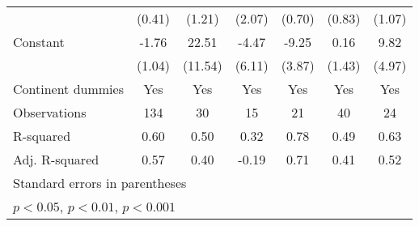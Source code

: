 {\begin{tabular}{l*{6}{c}}
                    &      (0.41)         &      (1.21)         &      (2.07)         &      (0.70)         &      (0.83)         &      (1.07)         \\
\addlinespace
Constant            &       -1.76         &       22.51         &       -4.47         &       -9.25\sym{*}  &        0.16         &        9.82         \\
                    &      (1.04)         &     (11.54)         &      (6.11)         &      (3.87)         &      (1.43)         &      (4.97)         \\
\addlinespace
Continent dummies   &         Yes         &         Yes         &         Yes         &         Yes         &         Yes         &         Yes         \\
\midrule
Observations        &         134         &          30         &          15         &          21         &          40         &          24         \\
R-squared           &        0.60         &        0.50         &        0.32         &        0.78         &        0.49         &        0.63         \\
Adj. R-squared      &        0.57         &        0.40         &       -0.19         &        0.71         &        0.41         &        0.52         \\
\bottomrule
\multicolumn{7}{l}{\footnotesize Standard errors in parentheses}\\
\multicolumn{7}{l}{\footnotesize \sym{*} \(p<0.05\), \sym{**} \(p<0.01\), \sym{***} \(p<0.001\)}\\
\end{tabular}
}
